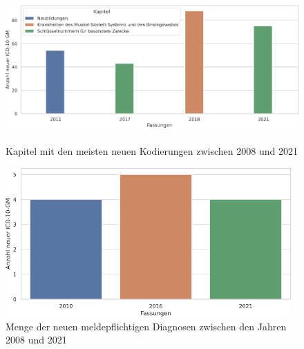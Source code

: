 \clearpage

\begin{figure}[ht]
	\centering
	\includegraphics[height=5.7cm]{figures/kaptnrYear}
	\caption[Kapitel mit den meisten eingeführten \acs{icd10gm} (2008 - 2021)]{Kapitel mit den meisten neuen Kodierungen zwischen 2008 und 2021}
	\label{fig:newicdcap}
\end{figure}

\begin{figure}[ht]
	\centering
	\includegraphics[height=5.7cm]{figures/arztJaYear}
	\caption[Neue meldepflichtige \acs{icd10gm} pro Jahr]{Menge der neuen meldepflichtigen Diagnosen zwischen den Jahren 2008 und 2021}
	\label{fig:newicdmeld}
\end{figure} 

